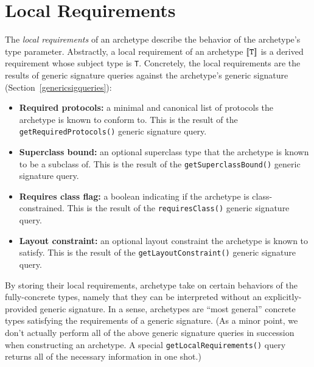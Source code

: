 \documentclass[../generics]{subfiles}
\begin{document}
\section{Local Requirements}\label{local requirements}

The \emph{local requirements} of an archetype describe the behavior of the archetype's type parameter. Abstractly, a local requirement of an archetype $[\![\texttt{T}]\!]$ is a derived requirement whose subject type is \texttt{T}. Concretely, the local requirements are the results of generic signature queries against the archetype's generic signature (Section~\ref{genericsigqueries}):
\begin{itemize}
\item \textbf{Required protocols:} a minimal and canonical list of protocols the archetype is known to conform to. This is the result of the \texttt{getRequiredProtocols()} generic signature query.
\item \textbf{Superclass bound:} an optional superclass type that the archetype is known to be a subclass of. This is the result of the \texttt{getSuperclassBound()} generic signature query.
\item \textbf{Requires class flag:} a boolean indicating if the archetype is class-constrained. This is the result of the \texttt{requiresClass()} generic signature query.
\item \textbf{Layout constraint:} an optional layout constraint the archetype is known to satisfy. This is the result of the \texttt{getLayoutConstraint()} generic signature query.
\end{itemize}
By storing their local requirements, archetype take on certain behaviors of the fully-concrete types, namely that they can be interpreted without an explicitly-provided generic signature. In a sense, archetypes are ``most general'' concrete types satisfying the requirements of a generic signature. (As a minor point, we don't actually perform all of the above generic signature queries in succession when constructing an archetype. A special \texttt{getLocalRequirements()} query returns all of the necessary information in one shot.)
\end{document}
